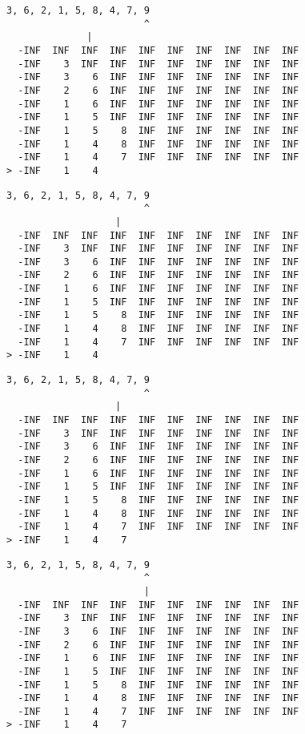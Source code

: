 { \begin{verbatim}
3, 6, 2, 1, 5, 8, 4, 7, 9
                        ^
              |
  -INF  INF  INF  INF  INF  INF  INF  INF  INF  INF
  -INF    3  INF  INF  INF  INF  INF  INF  INF  INF
  -INF    3    6  INF  INF  INF  INF  INF  INF  INF
  -INF    2    6  INF  INF  INF  INF  INF  INF  INF
  -INF    1    6  INF  INF  INF  INF  INF  INF  INF
  -INF    1    5  INF  INF  INF  INF  INF  INF  INF
  -INF    1    5    8  INF  INF  INF  INF  INF  INF
  -INF    1    4    8  INF  INF  INF  INF  INF  INF
  -INF    1    4    7  INF  INF  INF  INF  INF  INF
> -INF    1    4                                   
\end{verbatim} }

{ \begin{verbatim}
3, 6, 2, 1, 5, 8, 4, 7, 9
                        ^
                   |
  -INF  INF  INF  INF  INF  INF  INF  INF  INF  INF
  -INF    3  INF  INF  INF  INF  INF  INF  INF  INF
  -INF    3    6  INF  INF  INF  INF  INF  INF  INF
  -INF    2    6  INF  INF  INF  INF  INF  INF  INF
  -INF    1    6  INF  INF  INF  INF  INF  INF  INF
  -INF    1    5  INF  INF  INF  INF  INF  INF  INF
  -INF    1    5    8  INF  INF  INF  INF  INF  INF
  -INF    1    4    8  INF  INF  INF  INF  INF  INF
  -INF    1    4    7  INF  INF  INF  INF  INF  INF
> -INF    1    4                                   
\end{verbatim} }

{ \begin{verbatim}
3, 6, 2, 1, 5, 8, 4, 7, 9
                        ^
                   |
  -INF  INF  INF  INF  INF  INF  INF  INF  INF  INF
  -INF    3  INF  INF  INF  INF  INF  INF  INF  INF
  -INF    3    6  INF  INF  INF  INF  INF  INF  INF
  -INF    2    6  INF  INF  INF  INF  INF  INF  INF
  -INF    1    6  INF  INF  INF  INF  INF  INF  INF
  -INF    1    5  INF  INF  INF  INF  INF  INF  INF
  -INF    1    5    8  INF  INF  INF  INF  INF  INF
  -INF    1    4    8  INF  INF  INF  INF  INF  INF
  -INF    1    4    7  INF  INF  INF  INF  INF  INF
> -INF    1    4    7                              
\end{verbatim} }

{ \begin{verbatim}
3, 6, 2, 1, 5, 8, 4, 7, 9
                        ^
                        |
  -INF  INF  INF  INF  INF  INF  INF  INF  INF  INF
  -INF    3  INF  INF  INF  INF  INF  INF  INF  INF
  -INF    3    6  INF  INF  INF  INF  INF  INF  INF
  -INF    2    6  INF  INF  INF  INF  INF  INF  INF
  -INF    1    6  INF  INF  INF  INF  INF  INF  INF
  -INF    1    5  INF  INF  INF  INF  INF  INF  INF
  -INF    1    5    8  INF  INF  INF  INF  INF  INF
  -INF    1    4    8  INF  INF  INF  INF  INF  INF
  -INF    1    4    7  INF  INF  INF  INF  INF  INF
> -INF    1    4    7                              
\end{verbatim} }

